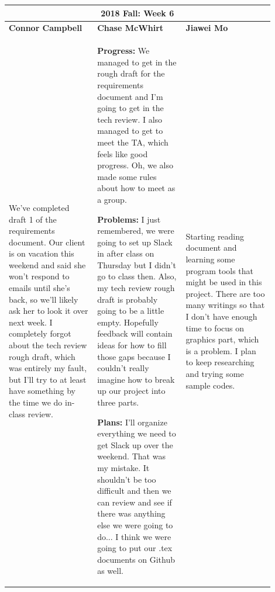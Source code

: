\documentclass[10pt,journal,compsoc, draftclsnofoot,onecolumn]{IEEEtran}
\begin{document}
\begin{center}
\begin{tabular}{|p{0.3\linewidth}|p{0.3\linewidth}|p{0.3\linewidth}|}
\hline
\multicolumn{3}{|c|}{\textbf{2018 Fall: Week 6}} \\
\hline
\textbf{Connor Campbell} & \textbf{Chase McWhirt} & \textbf{Jiawei Mo} \\ [0.5ex]
\hline\hline

We've completed draft 1 of the requirements document. Our client is on vacation this weekend and said she won't respond to emails until she's back, so we'll likely ask her to look it over next week. I completely forgot about the tech review rough draft, which was entirely my fault, but I'll try to at least have something by the time we do in-class review.
&
\textbf{Progress:} We managed to get in the rough draft for the requirements document and I'm going to get in the tech review.
I also managed to get to meet the TA, which feels like good progress.
Oh, we also made some rules about how to meet as a group.

\textbf{Problems:} I just remembered, we were going to set up Slack in after class on Thursday but I didn't go to class then.
Also, my tech review rough draft is probably going to be a little empty.
Hopefully feedback will contain ideas for how to fill those gaps because I couldn't really imagine how to break up our project into three parts.

\textbf{Plans:} I'll organize everything we need to get Slack up over the weekend.
That was my mistake.
It shouldn't be too difficult and then we can review and see if there was anything else we were going to do...
I think we were going to put our .tex documents on Github as well.
&
Starting reading document and learning some program tools that might be used in this project. There are too many writings so that I don't have enough time to focus on graphics part, which is a problem. I plan to keep researching and trying some sample codes.
\\ \hline
\end{tabular}
\end{center}
\end{document}
